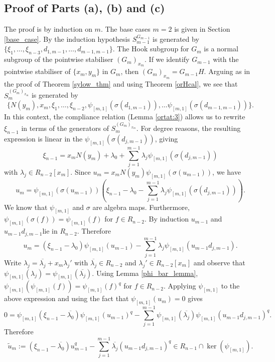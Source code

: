 \documentclass{amsart}
\begin{document}
\subsection{Proof of Parts (a), (b) and (c)}
The proof is by induction on $m$.
The base cases $m=2$ is given in Section \ref{base_case}.
By the induction hypothesis $S_{m-1}^{G_{m-1}}$ is generated by $\{\xi_1,\ldots,\xi_{n-3},d_{1,m-1},\ldots, d_{m-1,m-1}\}$.
The Hook subgroup for $G_m$ is a normal subgroup of the pointwise stabiliser $(G_m)_{x_m}$.
If we identify $G_{m-1}$ with the pointwise stabiliser of $\{x_m,y_m\}$ in $G_m$, then $(G_m)_{x_m}=G_{m-1}H$.
Arguing as in the proof of Theorem \ref{sylow_thm} and using Theorem \ref{orHcal}, we see that $S_m^{(G_m)_{x_m}}$ is generated by
$$\{N(y_m),x_m,\xi_1,\ldots,\xi_{n-2},\psi_{[m,1]}(\sigma(d_{1,m-1})),\ldots \psi_{[m,1]}(\sigma(d_{m-1,m-1}))\}.$$
In this context, the compliance relation (Lemma \ref{ortat:3}) allows us to rewrite $\xi_{n-1}$ in terms of the generators of $S_m^{(G_m)_{x_m}}$.
For degree reasons, the resulting expression is linear in the $\psi_{[m,1]}(\sigma(d_{j,m-1}))$, giving
$$\xi_{n-1}=x_mN(y_m)+\lambda_0+\sum_{j=1}^{m-1}\lambda_j \psi_{[m,1]}(\sigma(d_{j,m-1}))$$
with $\lambda_j\in R_{n-2}[x_m]$.
Since $u_m=x_mN(y_m)\psi_{[m,1]}(\sigma(u_{m-1}))$, we have
$$u_m=\psi_{[m,1]}(\sigma(u_{m-1}))\left(\xi_{n-1}-\lambda_0-\sum_{j=1}^{m-1}\lambda_j \psi_{[m,1]}(\sigma(d_{j,m-1}))\right).$$
We know that $\psi_{[m,1]}$ and $\sigma$ are algebra maps. Furthermore, $\psi_{[m,1]}(\sigma(f))=\psi_{[m,1]}(f)$ for $f\in R_{n-2}$.
By induction $u_{m-1}$ and $u_{m-1}d_{j,m-1}$lie in $R_{n-2}$. Therefore
$$u_m=(\xi_{n-1}-\lambda_0)\psi_{[m,1]}(u_{m-1})-\sum_{j=1}^{m-1}\lambda_j \psi_{[m,1]}(u_{m-1}d_{j,m-1}).$$
Write $\lambda_j=\overline{\lambda_j}+x_m\lambda_j'$ with $\overline{\lambda_j}\in R_{n-2}$ and $\lambda_j'\in R_{n-2}[x_m]$
and observe that $\psi_{[m,1]}(\lambda_j)=\psi_{[m,1]}(\overline{\lambda_j})$.
Using Lemma \ref{phi_bar_lemma}, $\psi_{[m,1]}(\psi_{[m,1]}(f))=\psi_{[m,1]}(f)^q$ for $f\in R_{n-2}$.
Applying $\psi_{[m,1]}$ to the above expression and using the fact that $\psi_{[m,1]}(u_m)=0$ gives
$$0=\psi_{[m,1]}(\xi_{n-1}-\overline{\lambda_0})\psi_{[m,1]}(u_{m-1})^q-\sum_{j=1}^{m-1}\psi_{[m,1]}(\overline{\lambda_j}) \psi_{[m,1]}(u_{m-1}d_{j,m-1})^q.$$
Therefore
\begin{equation}\label{ut_eqn}
    \widetilde{u}_m:=(\xi_{n-1}-\overline{\lambda_0})u_{m-1}^q-\sum_{j=1}^{m-1}\overline{\lambda_j} (u_{m-1}d_{j,m-1})^q\in R_{n-1}\cap\ker(\psi_{[m,1]}).
\end{equation}
\end{document}
